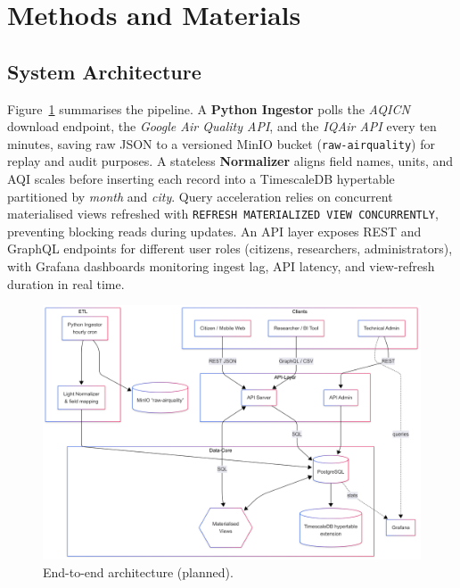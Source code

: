 \section{Methods and Materials}\label{sec:methods}

\subsection{System Architecture}\label{subsec:architecture}
Figure~\ref{fig:architecture} summarises the pipeline.  
A \textbf{Python Ingestor} polls the \textit{AQICN} download endpoint, the \textit{Google Air Quality API}, and the \textit{IQAir API} every ten minutes, saving raw JSON to a versioned MinIO bucket (\texttt{raw-airquality}) for replay and audit purposes\cite{minio,aqicnhist,googleair,iqair}.  
A stateless \textbf{Normalizer} aligns field names, units, and AQI scales before inserting each record into a TimescaleDB hypertable partitioned by \textit{month} and \textit{city}\cite{timescale}.  
Query acceleration relies on concurrent materialised views refreshed with \texttt{REFRESH MATERIALIZED VIEW CONCURRENTLY}\cite{postgsmv}, preventing blocking reads during updates.  
An API layer exposes REST and GraphQL endpoints for different user roles (citizens, researchers, administrators), with Grafana dashboards monitoring ingest lag, API latency, and view-refresh duration in real time\cite{grafana}.  

\begin{figure}[tb]
  \centering
  \includegraphics[width=\linewidth]{Pictures/fig1_architecture.png}
  \caption{End-to-end architecture (planned).}
  \label{fig:architecture}
\end{figure}


